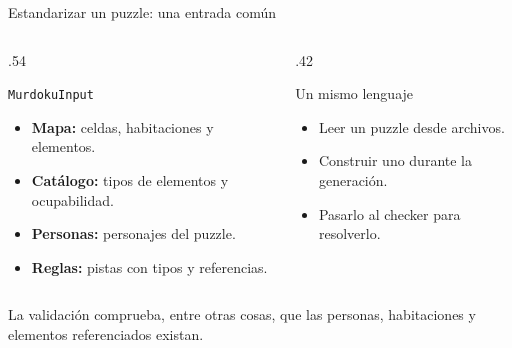 \documentclass[aspectratio=169,11pt]{beamer}
\begin{document}
\begin{frame}{Estandarizar un puzzle: una entrada com\'un}
  \begin{columns}[T,onlytextwidth]
    \begin{column}{.54\textwidth}
      \begin{block}{\texttt{MurdokuInput}}
        \begin{itemize}
          \item \textbf{Mapa:} celdas, habitaciones y elementos.
          \item \textbf{Cat\'alogo:} tipos de elementos y ocupabilidad.
          \item \textbf{Personas:} personajes del puzzle.
          \item \textbf{Reglas:} pistas con tipos y referencias.
        \end{itemize}
      \end{block}
    \end{column}
    \begin{column}{.42\textwidth}
      \begin{exampleblock}{Un mismo lenguaje}
        \begin{itemize}
          \item Leer un puzzle desde archivos.
          \item Construir uno durante la generaci\'on.
          \item Pasarlo al checker para resolverlo.
        \end{itemize}
      \end{exampleblock}
    \end{column}
  \end{columns}
  \small La validaci\'on comprueba, entre otras cosas, que las personas,
  habitaciones y elementos referenciados existan.
\end{frame}
\end{document}
